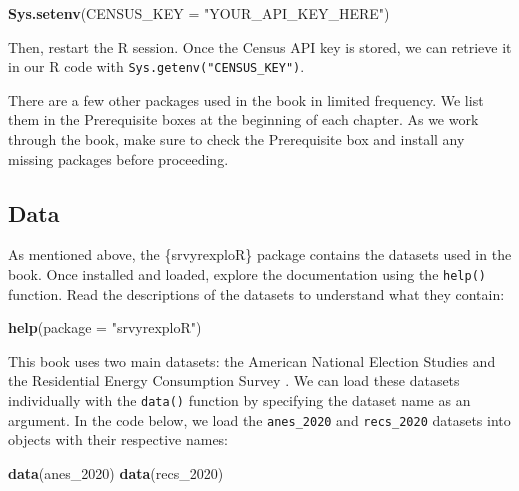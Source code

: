 \documentclass[
]{krantz}
\makeatletter
\newenvironment{Shaded}{\begin{snugshade}}{\end{snugshade}}
\newcommand{\AttributeTok}[1]{\textcolor[rgb]{0.27,0.27,0.27}{#1}}
\newcommand{\FunctionTok}[1]{\textcolor[rgb]{0.27,0.27,0.27}{\textbf{#1}}}
\newcommand{\NormalTok}[1]{#1}
\newcommand{\StringTok}[1]{\textcolor[rgb]{0.5,0.5,0.5}{#1}}
\newenvironment{kframe}{%
\medskip{}
\setlength{\fboxsep}{.8em}
 \def\at@end@of@kframe{}%
 \ifinner\ifhmode%
  \def\at@end@of@kframe{\end{minipage}}%
  \begin{minipage}{\columnwidth}%
 \fi\fi%
 \def\FrameCommand##1{\hskip\@totalleftmargin \hskip-\fboxsep
 \colorbox{shadecolor}{##1}\hskip-\fboxsep
     \hskip-\linewidth \hskip-\@totalleftmargin \hskip\columnwidth}%
 \MakeFramed {\advance\hsize-\width
   \@totalleftmargin\z@ \linewidth\hsize
   \@setminipage}}%
 {\par\unskip\endMakeFramed%
 \at@end@of@kframe}
\renewenvironment{Shaded}{\begin{kframe}}{\end{kframe}}
\makeatother
\begin{document}
\begin{Shaded}
\begin{Highlighting}[]
\FunctionTok{Sys.setenv}\NormalTok{(}\AttributeTok{CENSUS\_KEY =} \StringTok{"YOUR\_API\_KEY\_HERE"}\NormalTok{)}
\end{Highlighting}
\end{Shaded}

Then, restart the R session. Once the Census API key is stored, we can retrieve it in our R code with \texttt{Sys.getenv("CENSUS\_KEY")}.

There are a few other packages used in the book in limited frequency. We list them in the Prerequisite boxes at the beginning of each chapter. As we work through the book, make sure to check the Prerequisite box and install any missing packages before proceeding.

\hypertarget{data}{%
\subsection{Data}\label{data}}

As mentioned above, the \{srvyrexploR\} package contains the datasets used in the book. Once installed and loaded, explore the documentation using the \texttt{help()} function. Read the descriptions of the datasets to understand what they contain:

\begin{Shaded}
\begin{Highlighting}[]
\FunctionTok{help}\NormalTok{(}\AttributeTok{package =} \StringTok{"srvyrexploR"}\NormalTok{)}
\end{Highlighting}
\end{Shaded}

This book uses two main datasets: the American National Election Studies \citep[ANES --][]{debell} and the Residential Energy Consumption Survey \citep[RECS --][]{recs-2020-tech}. We can load these datasets individually with the \texttt{data()} function by specifying the dataset name as an argument. In the code below, we load the \texttt{anes\_2020} and \texttt{recs\_2020} datasets into objects with their respective names:

\begin{Shaded}
\begin{Highlighting}[]
\FunctionTok{data}\NormalTok{(anes\_2020)}
\FunctionTok{data}\NormalTok{(recs\_2020)}
\end{Highlighting}
\end{Shaded}
\end{document}
